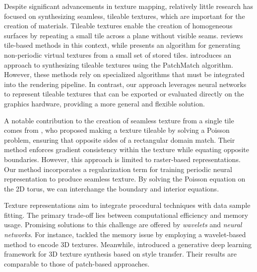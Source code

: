 Despite significant advancements in texture mapping, relatively little research has focused on synthesizing seamless, tileable textures, which are important for the creation of materials. Tileable textures enable the creation of homogeneous surfaces by repeating a small tile across a plane without visible seams. \citet{tileinteractive} reviews tile-based methods in this context, while \citet{tilehard} presents an algorithm for generating non-periodic virtual textures from a small set of stored tiles. \citet{Moritz2017Texture} introduces an approach to synthesizing tileable textures using the PatchMatch algorithm. However, these methods rely on specialized algorithms that must be integrated into the rendering pipeline. In contrast, our approach leverages neural networks to represent tileable textures that can be exported or evaluated directly on the graphics hardware, providing a more general and flexible solution.
%

A notable contribution to the creation of seamless texture from a single tile comes from \citet{perez2003}, who proposed making a texture tileable by solving a Poisson problem, ensuring that opposite sides of a rectangular domain match. Their method enforces gradient consistency within the texture while equating opposite boundaries. However, this approach is limited to raster-based representations. Our method incorporates a regularization term for training periodic neural representation to produce seamless texture. By solving the Poisson equation on the 2D torus, we can interchange the boundary and interior equations.


Texture representations aim to integrate procedural techniques with data sample fitting. The primary trade-off lies between computational efficiency and memory usage. Promising solutions to this challenge are offered by \emph{wavelets} and \emph{neural networks}. For instance, \citet{BAJAJ-2000} tackled the memory issue by employing a wavelet-based method to encode 3D textures. Meanwhile, \citet{Gutierrez-2019} introduced a generative deep learning framework for 3D texture synthesis based on style transfer. Their results are comparable to those of patch-based approaches.

